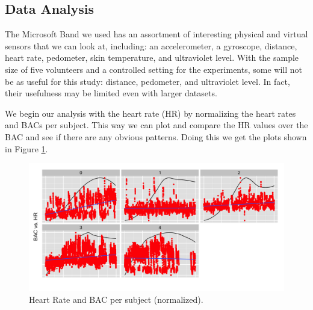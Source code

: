 \subsection{Data Analysis}

The Microsoft Band we used has an assortment of interesting physical and virtual sensors that we can look at, including: an accelerometer, a gyroscope, distance, heart rate, pedometer, skin temperature, and ultraviolet level. With the sample size of five volunteers and a controlled setting for the experiments, some will not be as useful for this study: distance, pedometer, and ultraviolet level. In fact, their usefulness may be limited even with larger datasets. 

We begin our analysis with the heart rate (HR) by normalizing the heart rates and BACs per subject. This way we can plot and compare the HR values over the BAC and see if there are any obvious patterns. Doing this we get the plots shown in Figure \ref{fig:heart_rate_facet}.

\begin{figure}
	\includegraphics[width=1.0\textwidth]{../figs/heart_rates}
	\caption{Heart Rate and BAC per subject (normalized).}
	\label{fig:heart_rate_facet}
\end{figure}

